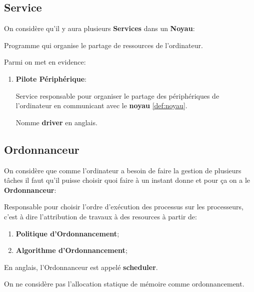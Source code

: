 \documentclass{article}
\begin{document}
\subsection{Service}
On considère qu'il y aura plusieurs \textbf{Services} dans un \textbf{Noyau}:
\begin{definition}\label{def:service}
    Programme qui organise le partage de ressources de l'ordinateur.
\end{definition}
Parmi on met en evidence:
\begin{enumerate}[rightmargin = \leftmargin]
    \item \textbf{Pilote Périphérique}:
    \begin{definition}\label{def:pilotePeripherique}
        Service responsable pour organiser le partage des périphériques de l'ordinateur en communicant avec le \textbf{noyau} \ref{def:noyau}.
        
        \begin{remark}
            Nomme \textbf{driver} en anglais.
        \end{remark}
    \end{definition}
\end{enumerate}


\subsection{Ordonnanceur}
On considère que comme l'ordinateur a besoin de faire la gestion de plusieurs tâches il faut qu'il puisse choisir quoi faire à un instant donne et pour ça on a le \textbf{Ordonnanceur}:
\begin{definition}\label{def:ordonnanceur}
    Responsable pour choisir l'ordre d'exécution des processus sur les processeurs, c'est à dire l'attribution de travaux à des resources à partir de:
    \begin{enumerate}[noitemsep]
        \item \textbf{Politique d'Ordonnancement};
        \item \textbf{Algorithme d'Ordonnancement};
    \end{enumerate}
    
    \begin{remark}
        En anglais, l'Ordonnanceur est appelé \textbf{scheduler}.
    \end{remark}
\end{definition}
On ne considère pas l'allocation statique de mémoire comme ordonnancement.
\end{document}
